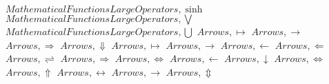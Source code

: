 \documentclass{article}
\begin{document}
\linebreak
$Mathematical Functions Large Operators,\sinh$
\linebreak
\linebreak
$Mathematical Functions Large Operators,\bigvee$
\linebreak
\linebreak
$Mathematical Functions Large Operators,\bigcup$
\linebreak
\linebreak
$Arrows,\mapsto$
\linebreak
\linebreak
$Arrows,\longrightarrow$
\linebreak
\linebreak
$Arrows,\Rightarrow$
\linebreak
\linebreak
$Arrows,\Downarrow$
\linebreak
\linebreak
$Arrows,\longmapsto$
\linebreak
\linebreak
$Arrows,\rightarrow$
\linebreak
\linebreak
$Arrows,\gets$
\linebreak
\linebreak
$Arrows,\Leftarrow$
\linebreak
\linebreak
$Arrows,\rightleftharpoons$
\linebreak
\linebreak
$Arrows,\Longrightarrow$
\linebreak
\linebreak
$Arrows,\iff$
\linebreak
\linebreak
$Arrows,\leftarrow$
\linebreak
\linebreak
$Arrows,\downarrow$
\linebreak
\linebreak
$Arrows,\Leftrightarrow$
\linebreak
\linebreak
$Arrows,\Uparrow$
\linebreak
\linebreak
$Arrows,\leftrightarrow$
\linebreak
\linebreak
$Arrows,\to$
\linebreak
\linebreak
$Arrows,\Updownarrow$
\end{document}
